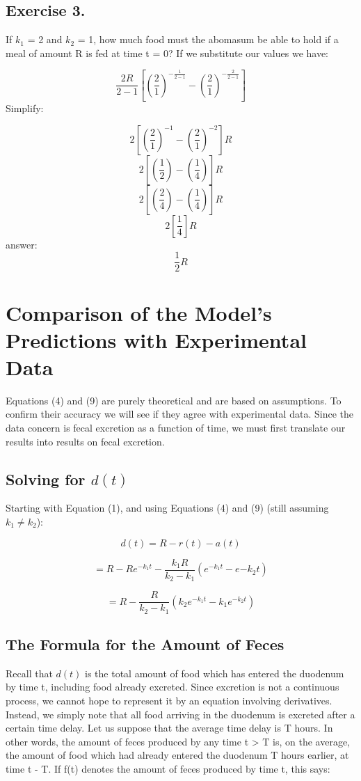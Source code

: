 \documentclass[]{article}
\begin{document}
\subsection{Exercise 3.}\label{exercise-3.}

If \(k_1\) = 2 and \(k_2\) = 1, how much food must the abomasum be able
to hold if a meal of amount R is fed at time t = 0? If we substitute our
values we have:

\[\frac{2 R}{2 - 1}[(\frac{2}{1})^{-\frac{1}{2-1}}-(\frac{2}{1})^{-\frac{2}{2-1}}]\]
Simplify:

\[2[(\frac{2}{1})^{-1}-(\frac{2}{1})^{-2}]R\]
\[2[(\frac{1}{2})-(\frac{1}{4})]R\] \[2[(\frac{2}{4})-(\frac{1}{4})]R\]
\[2[\frac{1}{4}]R\] answer: \[\frac{1}{2}R\]

\newpage

\section{Comparison of the Model's Predictions with Experimental
Data}\label{comparison-of-the-models-predictions-with-experimental-data}

Equations (4) and (9) are purely theoretical and are based on
assumptions. To confirm their accuracy we will see if they agree with
experimental data. Since the data concern is fecal excretion as a
function of time, we must first translate our results into results on
fecal excretion.

\subsection{\texorpdfstring{Solving for
\(d(t)\)}{Solving for d(t)}}\label{solving-for-dt}

Starting with Equation (1), and using Equations (4) and (9) (still
assuming \(k_1 \neq k_2\)):

\[d(t) = R - r(t) - a(t)\]

\[= R - Re^{-k_1t} - \frac{k_1R}{k_2 - k_1} (e^{-k_1t}-e{-k_2t})\]

\[= R - \frac{R}{k_2-k_1}(k_2e^{-k_1t} - k_1e^{-k_2t})\]

\subsection{The Formula for the Amount of
Feces}\label{the-formula-for-the-amount-of-feces}

Recall that \(d(t)\) is the total amount of food which has entered the
duodenum by time t, including food already excreted. Since excretion is
not a continuous process, we cannot hope to represent it by an equation
involving derivatives. Instead, we simply note that all food arriving in
the duodenum is excreted after a certain time delay. Let us suppose that
the average time delay is T hours. In other words, the amount of feces
produced by any time t \textgreater{} T is, on the average, the amount
of food which had already entered the duodenum T hours earlier, at time
t - T. If f(t) denotes the amount of feces produced by time t, this
says:
\end{document}
